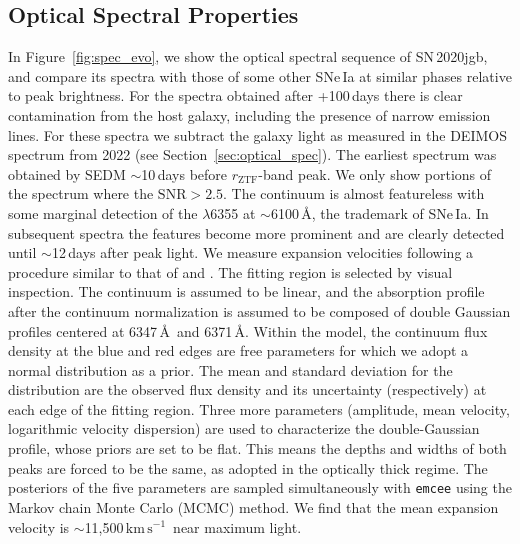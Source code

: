 \documentclass[twocolumn]{aastex631}
\newcommand{\sn}{SN\,2020jgb}
\newcommand{\kms}{$\mathrm{km}\,\mathrm{s}^{-1}$}
\begin{document}
\begin{CJK*}{UTF8}{gbsn}
\subsection{Optical Spectral Properties}
In Figure~\ref{fig:spec_evo}, we show the optical spectral sequence of \sn, and compare its spectra with those of some other SNe\,Ia at similar phases relative to peak brightness. For the spectra obtained after +100\,days there is clear contamination from the host galaxy, including the presence of narrow emission lines. For these spectra we subtract the galaxy light as measured in the DEIMOS spectrum from 2022 (see Section~\ref{sec:optical_spec}). The earliest spectrum was obtained by SEDM $\sim$10\,days before $r_\mathrm{ZTF}$-band peak. We only show portions of the spectrum where the $\mathrm{SNR}>2.5$. The continuum is almost featureless with some marginal detection of the  $\lambda$6355 at $\sim$6100\,\AA, the trademark of SNe\,Ia. In subsequent spectra the  features become more prominent and are clearly detected until $\sim$12\,days after peak light. We measure  expansion velocities following a procedure similar to that of  \citet{Childress_2013,Childress_2014} and \citet{Maguire_2014}. The fitting region is selected by visual inspection. The continuum is assumed to be linear, and the absorption profile after the continuum normalization is assumed to be composed of double Gaussian profiles centered at 6347\,\AA\ and 6371\,\AA. Within the model, the continuum flux density at the blue and red edges are free parameters for which we adopt a normal distribution as a prior. The mean and standard deviation for the distribution are the observed flux density and its uncertainty (respectively) at each edge of the fitting region. Three more parameters (amplitude, mean velocity, logarithmic velocity dispersion) are used to characterize the double-Gaussian profile, whose priors are set to be flat. This means the depths and widths of both peaks are forced to be the same, as \citet{Maguire_2014} adopted in the optically thick regime. The posteriors of the five parameters are sampled simultaneously with \texttt{emcee} \citep{emcee_2013} using the Markov chain Monte Carlo (MCMC) method. We find that the mean expansion velocity is $\sim$11,500\,\kms\ near maximum light.


\end{CJK*}
\end{document}
